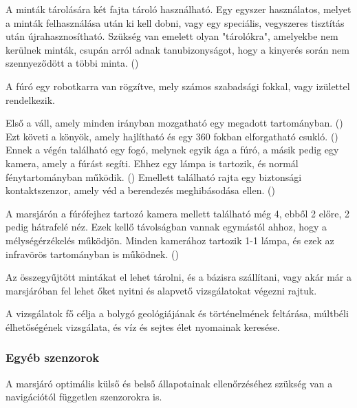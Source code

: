 \documentclass[12pt]{report}
\begin{document}
A minták tárolására két fajta tároló használható. Egy egyszer használatos, melyet a minták felhasználása után ki kell dobni, vagy egy speciális, vegyszeres tisztítás után újrahasznosítható. Szükség van emelett olyan "tárolókra", amelyekbe nem kerülnek minták, csupán arról adnak tanubizonyságot, hogy a kinyerés során nem szennyeződött a többi minta. () 

A fúró egy robotkarra van rögzítve, mely számos szabadsági fokkal, vagy izülettel rendelkezik. 

Első a váll, amely minden irányban mozgatható egy megadott tartományban. () Ezt követi a könyök, amely hajlítható és egy 360 fokban elforgatható csukló. () Ennek a végén található egy fogó, melynek egyik ága a fúró, a másik pedig egy kamera, amely a fúrást segíti.  Ehhez egy lámpa is tartozik, és normál fénytartományban működik. () Emellett található rajta egy biztonsági kontaktszenzor, amely véd a berendezés meghibásodása ellen. ()

A marsjárón a fúrófejhez tartozó kamera mellett található még 4, ebből 2 előre, 2 pedig hátrafelé néz. Ezek kellő távolságban vannak egymástól ahhoz, hogy a mélységérzékelés működjön. Minden kamerához tartozik 1-1 lámpa, és ezek az infravörös tartományban is működnek. ()

Az összegyűjtött mintákat el lehet tárolni, és a bázisra szállítani, vagy akár már a marsjáróban fel lehet őket nyitni és alapvető vizsgálatokat végezni rajtuk.

A vizsgálatok fő célja a bolygó geológiájának és történelmének feltárása, múltbéli élhetőségének vizsgálata, és víz és sejtes élet nyomainak keresése.

\subsubsection{Egyéb szenzorok}
A marsjáró optimális külső és belső állapotainak ellenőrzéséhez szükség van a navigációtól független szenzorokra is.
\end{document}

